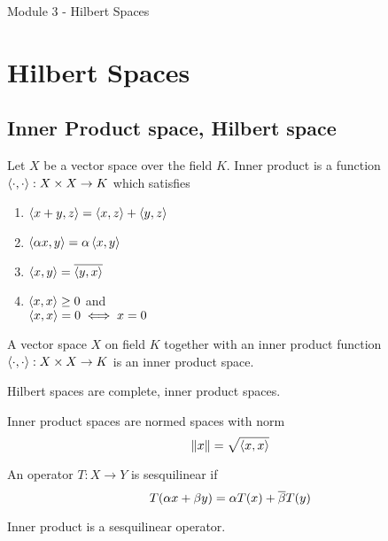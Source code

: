 \pagebreak
{\Large Module 3 - Hilbert Spaces}
\section{Hilbert Spaces}
\subsection{Inner Product space, Hilbert space}
\begin{definition}
	Let $X$ be a vector space over the field $K$.
	Inner product is a function $\left\langle \cdot,\cdot \right\rangle : X \times X \to K$ which satisfies
	\begin{enumerate}
		\item $\left\langle x+y,z \right\rangle = \left\langle x,z \right\rangle + \left\langle y,z \right\rangle$
		\item $\left\langle \alpha x,y \right\rangle = \alpha \left\langle x,y \right\rangle$
		\item $\left\langle x,y \right\rangle = \overline{\left\langle y,x \right\rangle}$
		\item $\left\langle x,x \right\rangle \ge 0$ and \\
			$\left\langle x,x \right\rangle = 0 \iff x = 0$
	\end{enumerate}
\end{definition}
\begin{definition}
	A vector space $X$ on field $K$ together with an inner product function $\left\langle \cdot,\cdot \right\rangle : X \times X \to K$ is an inner product space.
\end{definition}
\begin{definition}[Hilbert]
	Hilbert spaces are complete, inner product spaces.
\end{definition}

\begin{remark}
	Inner product spaces are normed spaces with norm 
	\[ \|x\| = \sqrt{\left\langle x,x \right\rangle} \]
\end{remark}

\begin{definition}[sesquilinear]
	An operator $T : X \to Y$ is sesquilinear if 
	\[ T(\alpha x + \beta y) = \alpha T(x) + \overline{\beta}T(y) \]
\end{definition}

\begin{important}
Inner product is a sesquilinear operator.
\end{important}

